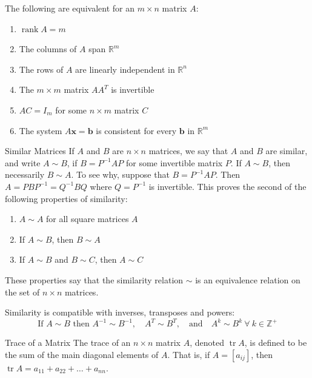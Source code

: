 \documentclass[12pt]{article}
\begin{document}
\begin{theorem}{}{}
    The following are equivalent for an $ m \times n $ matrix $ A $:
    \begin{enumerate}
        \item $ \operatorname{rank} A = m $
        \item The columns of $ A $ span $ \mathbb{R}^m $
        \item The rows of $ A $ are linearly independent in $ \mathbb{R}^n $
        \item The $ m \times m $ matrix $ A A^T $ is invertible
        \item $ AC = I_m $ for some $ n \times m $ matrix $ C $
        \item The system $ A \mathbf{x} = \mathbf{b} $ is consistent for every $ \mathbf{b} $ in $ \mathbb{R}^m $
    \end{enumerate}
\end{theorem}

\begin{definition}{Similar Matrices}{}
    If $ A $ and $ B $ are $ n \times n $ matrices, we say that $ A $ and $ B $ are similar, and write $ A \sim B $, if $ B = P^{-1} A P $ for some invertible matrix $ P $.
    \medskip
    \newline
    If $ A \sim B $, then necessarily $ B \sim A $. To see why, suppose that $ B = P^{-1} A P $. Then $ A = P B P^{-1} = Q^{-1} B Q $ where $ Q = P^{-1} $ is invertible. This proves the second of the following properties of similarity:
    \begin{enumerate}
        \item $ A \sim A $ for all square matrices $ A $
        \item If $ A \sim B $, then $ B \sim A $
        \item If $ A \sim B $ and $ B \sim C $, then $ A \sim C $
    \end{enumerate}
    These properties say that the similarity relation $ \sim $ is an equivalence relation on the set of $ n \times n $ matrices.
\end{definition}

\begin{note}{}{}
    Similarity is compatible with inverses, transposes and powers:
    \[ \text{If } A \sim B \text{ then } A^{-1} \sim B^{-1}, \quad A^T \sim B^T, \quad \text{and} \quad A^k \sim B^k \ \forall \ k \in \mathbb{Z}^+ \]
\end{note}

\begin{definition}{Trace of a Matrix}{}
    The trace of an $ n \times n $ matrix $ A $, denoted $ \operatorname{tr} A $, is defined to be the sum of the main diagonal elements of $ A $. That is, if $ A = \left[ a_{ij} \right] $, then $ \operatorname{tr} A = a_{11} + a_{22} + \dots + a_{nn} $.
\end{definition}
\end{document}
